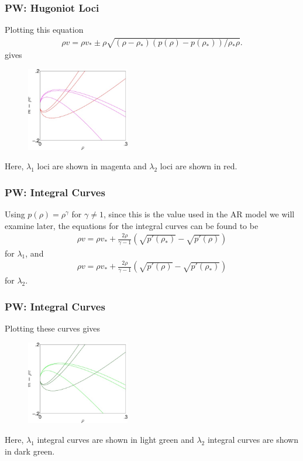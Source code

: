 \documentclass{beamer}
\begin{document}
\begin{frame}
\frametitle{PW: Hugoniot Loci}
Plotting this equation 
\begin{align*}
\rho v = \rho v_* \pm \rho \sqrt{\left( \rho - \rho_*\right) \left( p(\rho ) - p(\rho_*)\right) / \rho_*\rho }.
\end{align*}
gives
\begin{figure}[h!]
 \centering
  \includegraphics[width=45mm]{../MatlabCode/Images/PW_Loci.jpg}
\end{figure}
Here, $\lambda_1$ loci are shown in magenta and $\lambda_2$ loci are shown in red.
\end{frame}

\begin{frame}
\frametitle{PW: Integral Curves}
Using $p(\rho) = \rho^{\gamma}$ for $\gamma \neq 1$, since this is the value used in the AR model we will examine later, the equations for the integral curves can be found to be
\begin{align*}
\rho v = \rho v_* + \frac{2 \rho}{\gamma - 1}\left( \sqrt{p'(\rho_*)} - \sqrt{p'(\rho)}\right)
\end{align*}
for $\lambda_1$, and 
\begin{align*}
\rho v = \rho v_* + \frac{2 \rho}{\gamma - 1}\left( \sqrt{p'(\rho)} - \sqrt{p'(\rho_*)} \right)
\end{align*}
for $\lambda_2$.
\end{frame}

\begin{frame}
\frametitle{PW: Integral Curves}
Plotting these curves gives
\begin{figure}[h!]
 \centering
  \includegraphics[width=45mm]{../MatlabCode/Images/PW_IntegralCurves.jpg}
\end{figure}
Here, $\lambda_1$ integral curves are shown in light green and $\lambda_2$ integral curves are shown in dark green.
\end{frame}
\end{document}
